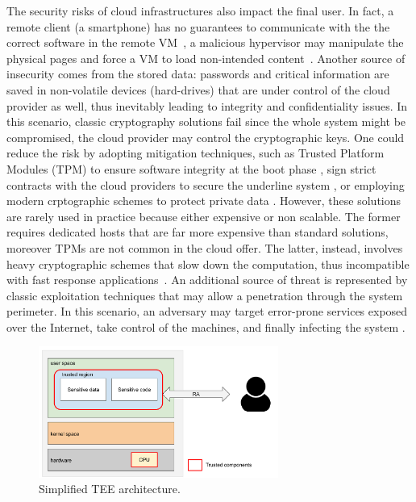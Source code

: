 The security risks of cloud infrastructures also impact the final 
user. In fact, a remote client (\eg a smartphone) has no guarantees to 
communicate with the the correct software in the remote 
VM~\citep{beekman2016attestation}, \eg a malicious hypervisor may manipulate 
the physical pages and force a VM to load non-intended 
content~\citep{10.1145/3292006.3300022}.
Another source of insecurity comes from the stored data: passwords and critical 
information are saved in non-volatile devices (\ie hard-drives) that are under 
control of the cloud provider as well, thus inevitably leading to integrity and 
confidentiality issues.
In this scenario, classic cryptography solutions fail since the whole system 
might be compromised, \ie the cloud provider may control the cryptographic keys.
%
One could reduce the risk by adopting mitigation techniques, such as 
Trusted Platform Modules (TPM) to ensure software integrity at the boot phase 
\citep{tpm-isoosi}, sign strict contracts with the cloud providers to secure 
the underline system \citep{aws_dedicated_host}, or employing modern 
crptographic schemes to protect private data \citep{gentry2009fully}.
%
However, these solutions are rarely used in practice because either expensive 
or non scalable. The former requires dedicated hosts that are far more 
expensive than standard solutions, moreover TPMs are not common in the cloud 
offer. 
The latter, instead, involves heavy cryptographic schemes that slow down the 
computation, thus incompatible with fast response 
applications~\citep{10.1145/2046660.2046682}.
%
An additional source of threat is represented by classic exploitation 
techniques that may allow a penetration through the system perimeter.
In this scenario, an adversary may target error-prone services exposed over the 
Internet, take control of the machines, and finally infecting the system 
\citep{van2012memory,10.1145/2810103.2813646}.


\begin{figure}[t]
	\centering
	\includegraphics[width=0.7\textwidth]{fig_c1/sgx-architecture.pdf}
	\caption[SGX architecture.]{Simplified TEE architecture.}
	\label{fig:sgx-architecture}
\end{figure}

